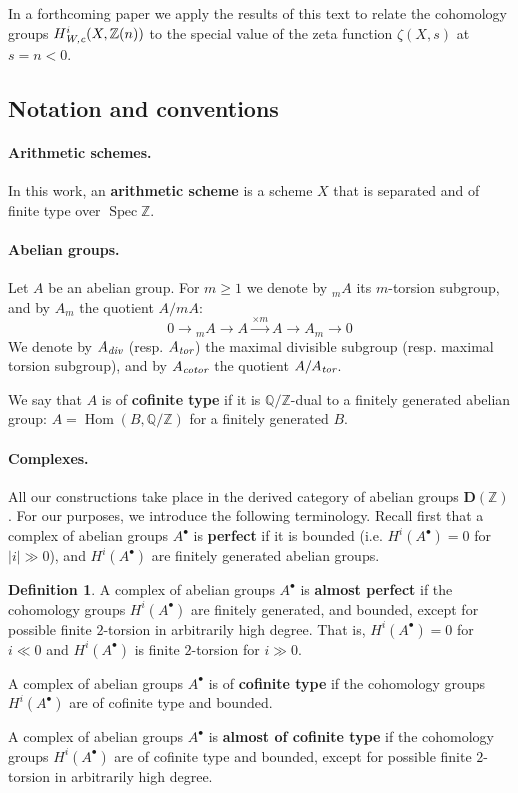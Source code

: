 \documentclass[leqno,12pt]{article}
\theoremstyle{plain}
\theoremstyle{definition}
\newtheorem{definition}[theorem]{\indent\sc Definition}
\DeclareMathOperator{\Spec}{Spec}
\DeclareMathOperator{\Hom}{Hom}
\DeclareMathOperator{\Ext}{Ext}
\newcommand{\QQ}{\mathbb{Q}}
\newcommand{\ZZ}{\mathbb{Z}}
\renewcommand{\div}{\text{\it div}}
\newcommand{\tor}{\text{\it tor}}
\newcommand{\cotor}{\text{\it cotor}}
\newcommand{\Wc}{\text{\it W,c}}
\newcommand{\DZ}{{\mathbf{D} (\ZZ)}}
\begin{document}
In a forthcoming paper we apply the results of this text to relate the
cohomology groups $H_\Wc^i (X, \ZZ(n))$ to the special value of the zeta
function $\zeta (X, s)$ at $s = n < 0$.

\subsection*{Notation and conventions}

\paragraph{Arithmetic schemes.}
In this work, an \textbf{arithmetic scheme} is a scheme $X$ that is separated
and of finite type over $\Spec \ZZ$.

\paragraph{Abelian groups.}
Let $A$ be an abelian group. For $m \ge 1$ we denote by ${}_m A$ its $m$-torsion
subgroup, and by $A_m$ the quotient $A/mA$:
$$0 \to {}_m A \to A \xrightarrow{\times m} A \to A_m \to 0$$
We denote by $A_\div$ (resp. $A_\tor$) the maximal divisible subgroup
(resp. maximal torsion subgroup), and by $A_\cotor$ the quotient $A/A_\tor$.


We say that $A$ is of \textbf{cofinite type} if it is $\QQ/\ZZ$-dual to a
finitely generated abelian group: $A = \Hom (B,\QQ/\ZZ)$ for a finitely
generated $B$.

\paragraph{Complexes.}
All our constructions take place in the derived category of abelian groups
$\DZ$. For our purposes, we introduce the following terminology. Recall first
that a complex of abelian groups $A^\bullet$ is \textbf{perfect} if it is
bounded (i.e. $H^i (A^\bullet) = 0$ for $|i| \gg 0$), and $H^i (A^\bullet)$ are
finitely generated abelian groups.

\begin{definition}
  \label{dfn:almost-of-(co)finite-type}
  A complex of abelian groups $A^\bullet$ is \textbf{almost perfect}
  if the cohomology groups $H^i (A^\bullet)$ are finitely generated, and
  bounded, except for possible finite $2$-torsion in arbitrarily high degree.
  That is, $H^i (A^\bullet) = 0$ for $i \ll 0$ and $H^i (A^\bullet)$ is finite
  $2$-torsion for $i \gg 0$.

  A complex of abelian groups $A^\bullet$ is of \textbf{cofinite type} if the
  cohomology groups $H^i (A^\bullet)$ are of cofinite type and bounded.

  A complex of abelian groups $A^\bullet$ is \textbf{almost of cofinite type}
  if the cohomology groups $H^i (A^\bullet)$ are of cofinite type and
  bounded, except for possible finite $2$-torsion in arbitrarily high
  degree.
\end{definition}
\end{document}
